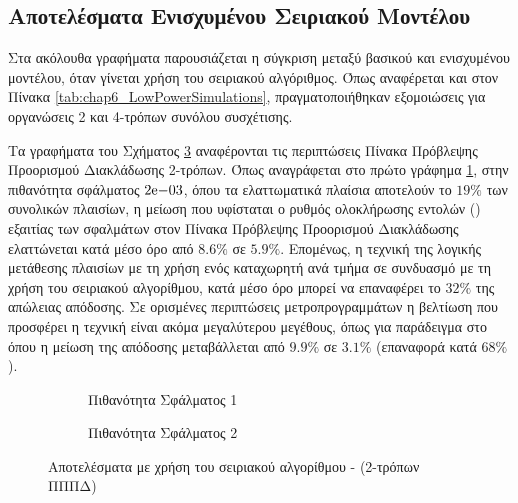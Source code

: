 
\subsection{Αποτελέσματα Ενισχυμένου Σειριακού Μοντέλου}
\label{chap6_gem5SerialAlgResults}

Στα ακόλουθα γραφήματα παρουσιάζεται η σύγκριση μεταξύ βασικού και ενισχυμένου μοντέλου, όταν γίνεται χρήση του σειριακού αλγόριθμος. Όπως αναφέρεται και στον Πίνακα \ref{tab:chap6_LowPowerSimulations}, πραγματοποιήθηκαν εξομοιώσεις για οργανώσεις 2 και 4-τρόπων συνόλου συσχέτισης.
\par
Τα γραφήματα του Σχήματος \ref{fig:chap6_serial_2way_ipc} αναφέρονται τις περιπτώσεις Πίνακα Πρόβλεψης Προορισμού Διακλάδωσης 2-τρόπων. Όπως αναγράφεται στο πρώτο γράφημα \ref{fig:chap6_serial_2way_pail1_ipc}, στην πιθανότητα σφάλματος $2\mathrm{e}{-03}$, όπου τα ελαττωματικά πλαίσια αποτελούν το $19\%$ των συνολικών πλαισίων, η μείωση που υφίσταται ο ρυθμός ολοκλήρωσης εντολών (\ipc) εξαιτίας των σφαλμάτων στον Πίνακα Πρόβλεψης Προορισμού Διακλάδωσης ελαττώνεται κατά μέσο όρο από $8.6\%$ σε $5.9\%$. Επομένως, η τεχνική της λογικής μετάθεσης πλαισίων με τη χρήση ενός καταχωρητή ανά τμήμα σε συνδυασμό με τη χρήση του σειριακού αλγορίθμου, κατά μέσο όρο μπορεί να επαναφέρει το $32\%$ της απώλειας απόδοσης. Σε ορισμένες περιπτώσεις μετροπρογραμμάτων η βελτίωση που προσφέρει η τεχνική είναι ακόμα μεγαλύτερου μεγέθους, όπως για παράδειγμα στο  όπου η μείωση της απόδοσης μεταβάλλεται από $9.9\%$ σε $3.1\%$ (επαναφορά κατά $68\%$).

\begin{figure}[!t]
    \centering
    \begin{subfigure}[t]{\textwidth}
        \centering
        \caption{Πιθανότητα Σφάλματος 1}
        \label{fig:chap6_serial_2way_pail1_ipc}
    \end{subfigure}
    
    \begin{subfigure}[t]{\textwidth}
        \centering
        \caption{Πιθανότητα Σφάλματος 2}
        \label{fig:chap6_serial_2way_pail2_ipc}
    \end{subfigure}
    
    \caption{Αποτελέσματα με χρήση του σειριακού αλγορίθμου - (2-τρόπων ΠΠΠΔ)}
    \label{fig:chap6_serial_2way_ipc}
\end{figure}

